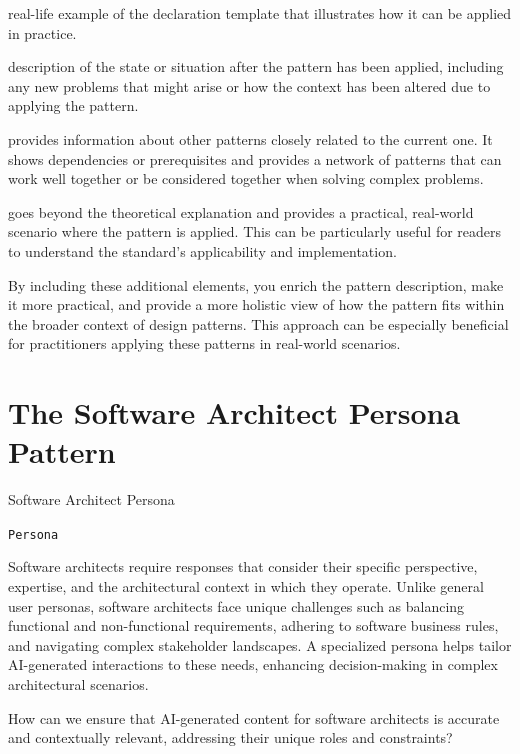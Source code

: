  real-life example of the declaration template that illustrates how it can be applied in practice.

 description of the state or situation after the pattern has been applied, including any new problems that might arise or how the context has been altered due to applying the pattern.

 provides information about other patterns closely related to the current one. It shows dependencies or prerequisites and provides a network of patterns that can work well together or be considered together when solving complex problems.

 goes beyond the theoretical explanation and provides a practical, real-world scenario where the pattern is applied. This can be particularly useful for readers to understand the standard's applicability and implementation.

By including these additional elements, you enrich the pattern description, make it more practical, and provide a more holistic view of how the pattern fits within the broader context of design patterns. This approach can be especially beneficial for practitioners applying these patterns in real-world scenarios.

\section{The Software Architect Persona Pattern} \label{sec:software-architect-persona}

 Software Architect Persona

\texttt{Persona}

 Software architects require responses that consider their specific perspective, expertise, and the architectural context in which they operate. Unlike general user personas, software architects face unique challenges such as balancing functional and non-functional requirements, adhering to software business rules, and navigating complex stakeholder landscapes. A specialized persona helps tailor AI-generated interactions to these needs, enhancing decision-making in complex architectural scenarios.

 How can we ensure that AI-generated content for software architects is accurate and contextually relevant, addressing their unique roles and constraints?

